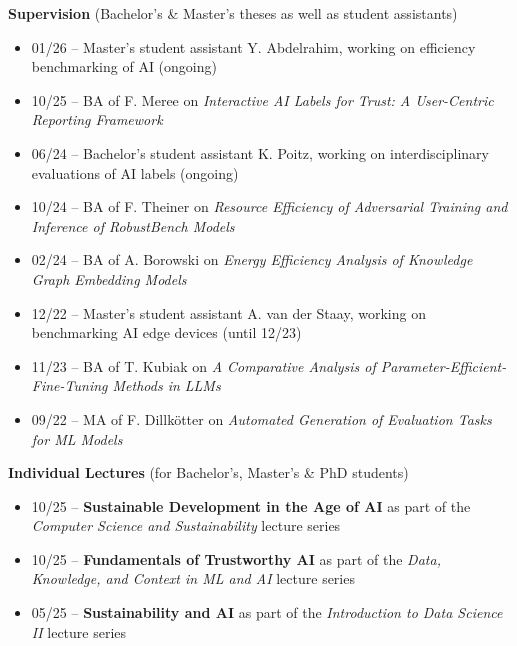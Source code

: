 \documentclass[12pt]{letter}
\begin{document}
\textbf{Supervision} (Bachelor's \& Master's theses as well as student assistants)\\[-1.5em]
{\footnotesize \begin{itemize}[leftmargin=1.2em,noitemsep,topsep=0pt]
    \item[] 01/26 -- Master's student assistant Y. Abdelrahim, working on efficiency benchmarking of AI (ongoing)
    \item[] 10/25 -- BA of F. Meree on \emph{Interactive AI Labels for Trust: A User-Centric Reporting Framework}
    \item[] 06/24 -- Bachelor's student assistant K. Poitz, working on interdisciplinary evaluations of AI labels (ongoing)
    \item[] 10/24 -- BA of F. Theiner on \emph{Resource Efficiency of Adversarial Training and Inference of RobustBench Models}
    \item[] 02/24 -- BA of A. Borowski on \emph{Energy Efficiency Analysis of Knowledge Graph Embedding Models}
    \item[] 12/22 -- Master's student assistant A. van der Staay, working on benchmarking AI edge devices (until 12/23)
    \item[] 11/23 -- BA of T. Kubiak on \emph{A Comparative Analysis of Parameter-Efficient-Fine-Tuning Methods in LLMs}
    \item[] 09/22 -- MA of F. Dillkötter on \emph{Automated Generation of Evaluation Tasks for ML Models}
\end{itemize}}
    
\textbf{Individual Lectures} (for Bachelor's, Master's \& PhD students)\\[-1.5em]
{\footnotesize \begin{itemize}[leftmargin=1.2em,noitemsep,topsep=0pt]
  \item[] 10/25 -- \textbf{Sustainable Development in the Age of AI} as part of the \emph{Computer Science and Sustainability} lecture series
  \item[] 10/25 -- \textbf{Fundamentals of Trustworthy AI} as part of the \emph{Data, Knowledge, and Context in ML and AI} lecture series
  \item[] 05/25 -- \textbf{Sustainability and AI} as part of the \emph{Introduction to Data Science II} lecture series
\end{itemize}}
\end{document}
